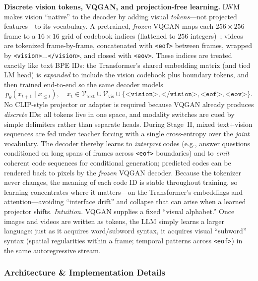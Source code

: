 \begin{enrichment}
\begin{enrichment}
        \newpage
        
        \textbf{Discrete vision tokens, VQGAN, and projection-free learning.}
        LWM makes vision “native” to the decoder by adding visual \emph{tokens}—not projected features—to its vocabulary. A pretrained, \emph{frozen} VQGAN maps each $256{\times}256$ frame to a $16{\times}16$ grid of codebook indices (flattened to $256$ integers)~\cite[Fig.~3]{liu2025_lwm}; videos are tokenized frame-by-frame, concatenated with \texttt{<eof>} between frames, wrapped by \texttt{<vision>}...\texttt{</vision>}, and closed with \texttt{<eov>}. These indices are treated exactly like text BPE IDs: the Transformer’s shared embedding matrix (and tied LM head) is \emph{expanded} to include the vision codebook plus boundary tokens, and then trained end-to-end so the same decoder models
        \[
        p_\theta(x_{t+1}\mid x_{\le t}),\quad x_t \in \mathcal{V}_{\text{text}} \cup \mathcal{V}_{\text{vis}} \cup \{\texttt{<vision>},\texttt{</vision>},\texttt{<eof>},\texttt{<eov>}\}.
        \]
        No CLIP-style projector or adapter is required because VQGAN already produces \emph{discrete} IDs; all tokens live in one space, and modality switches are cued by simple delimiters rather than separate heads. During Stage~II, mixed text+vision sequences are fed under teacher forcing with a single cross-entropy over the \emph{joint} vocabulary. The decoder thereby learns to \emph{interpret} codes (e.g., answer questions conditioned on long spans of frames across \texttt{<eof>} boundaries) and to \emph{emit} coherent code sequences for conditional generation; predicted codes can be rendered back to pixels by the \emph{frozen} VQGAN decoder. Because the tokenizer never changes, the meaning of each code ID is stable throughout training, so learning concentrates where it matters—on the Transformer’s embeddings and attention—avoiding “interface drift” and collapse that can arise when a learned projector shifts. \emph{Intuition.} VQGAN supplies a fixed “visual alphabet.” Once images and videos are written as tokens, the LLM simply learns a larger language: just as it acquires word/subword syntax, it acquires visual “subword” syntax (spatial regularities within a frame; temporal patterns across \texttt{<eof>}) in the same autoregressive stream.
        
        \subsubsection{Architecture \& Implementation Details}
        \label{enr:subsubsec_chapter24_lwm_impl}
        

\end{enrichment}
\end{enrichment}
